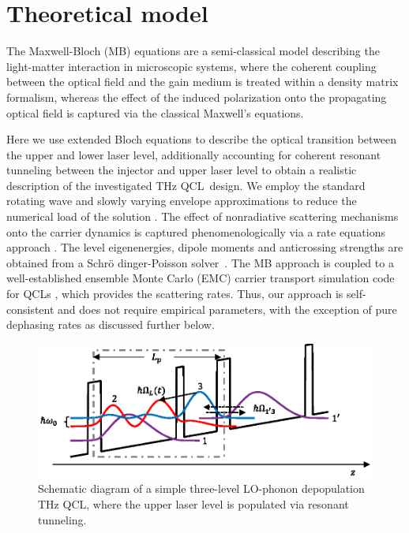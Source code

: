 \documentclass[10pt,letterpaper]{article}%
\begin{document}
\section{Theoretical model}

\label{sec:thmodel}

The Maxwell-Bloch (MB) equations are a semi-classical model describing the
light-matter interaction in microscopic systems, where the coherent coupling
between the optical field and the gain medium is treated within a density
matrix formalism, whereas the effect of the induced polarization onto the
propagating optical field is captured via the classical Maxwell's equations.

Here we use extended Bloch equations to describe the optical transition
between the upper and lower laser level, additionally accounting for coherent
resonant tunneling between the injector and upper laser level to obtain a
realistic description of the investigated THz QCL\ design. We employ the
standard rotating wave and slowly varying envelope approximations to reduce
the numerical load of the solution
\cite{boyd2003nonlinear,wang2007coherent,gordon2008multimode,gkortsas2010dynamics}%
. The effect of nonradiative scattering mechanisms onto the carrier dynamics
is captured phenomenologically via a rate equations approach
\cite{wang2015active,jirauschek2014modeling}. The level eigenenergies, dipole
moments and anticrossing strengths are obtained from a Schr{\"{o}}%
dinger-Poisson solver\ \cite{2009IJQE...45..1059J}. The MB approach is coupled
to a well-established ensemble Monte Carlo (EMC) carrier transport simulation
code for QCLs
\cite{jirauschek2007comparative,jirauschek2009monte,jirauschek2010monte, jirauschek2010monte_2},
which provides the scattering rates. Thus, our approach is self-consistent and
does not require empirical parameters, with the exception of pure dephasing
rates as discussed further below. 
\begin{figure}[h]
\centering\includegraphics[scale=0.7]{figs/TOYMODEL.eps}\caption{Schematic
diagram of a simple three-level LO-phonon depopulation THz QCL, where the
upper laser level is populated via resonant tunneling.}%
\label{fig:img01}%
\end{figure}
\end{document}
